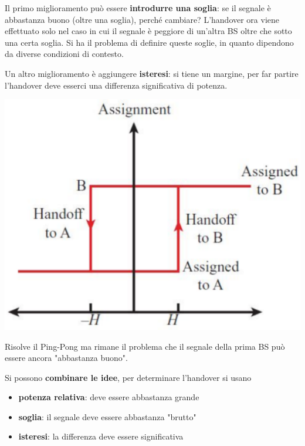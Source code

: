 Il primo miglioramento può essere \textbf{introdurre una soglia}: se il segnale è abbastanza buono (oltre una soglia), perché cambiare? L'handover ora viene effettuato solo nel caso in cui il segnale è peggiore di un'altra BS oltre che sotto una certa soglia. Si ha il problema di definire queste soglie, in quanto dipendono da diverse condizioni di contesto.

Un altro miglioramento è aggiungere \textbf{isteresi}: si tiene un margine, per far partire l'handover deve esserci una differenza significativa di potenza. 
\begin{center}
	\includegraphics[width=0.5\linewidth]{img/mobile/isteresi}
\end{center}

Risolve il Ping-Pong ma rimane il problema che il segnale della prima BS può essere ancora "abbastanza buono". 

Si possono \textbf{combinare le idee}, per determinare l'handover si usano 
\begin{itemize}
	\item \textbf{potenza relativa}: deve essere abbastanza grande
	
    \item \textbf{soglia}: il segnale deve essere abbastanza "brutto"
	
    \item \textbf{isteresi}: la differenza deve essere significativa
\end{itemize}

